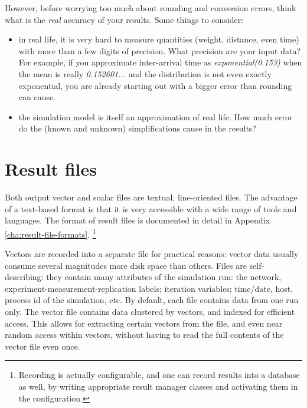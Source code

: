 However, before worrying too much about rounding and conversion errors,
think what is the \textit{real} accuracy of your results.
Some things to consider:

\begin{itemize}
  \item{in real life, it is very hard to measure quantities (weight, distance,
     even time) with more than a few digits of precision. What precision
     are your input data? For example, if you approximate inter-arrival
     time as \textit{exponential(0.153)} when the mean is really
     \textit{0.152601...} and the distribution is not even exactly exponential,
     you are already starting out with a bigger error than rounding can cause.}

  \item{the simulation model is itself an approximation of real life. How much
     error do the (known and unknown) simplifications cause in the results?}
\end{itemize}



\section{Result files}

Both output vector and scalar files are textual, line-oriented files.
The advantage of a text-based format is that it is very accessible
with a wide range of tools and languages. The format of result files is
documented in detail in Appendix \ref{cha:result-file-formats}.
  \footnote{Recording is actually configurable, and one can record
  results into a database as well, by writing appropriate result
  manager classes and activating them in the configuration.}

Vectors are recorded into a separate file for practical reasons: vector
data usually consume several magnitudes more disk space than others. Files
are self-describing: they contain many attributes of the simulation run:
the network, experiment-measurement-replication labels; iteration
variables; time/date, host, process id of the simulation, etc. By default,
each file contains data from one run only.
The vector file contains data clustered by vectors, and indexed for
efficient access. This allows for extracting certain vectors from the file,
and even near random access within vectors, without having to read the full
contents of the vector file even once.

